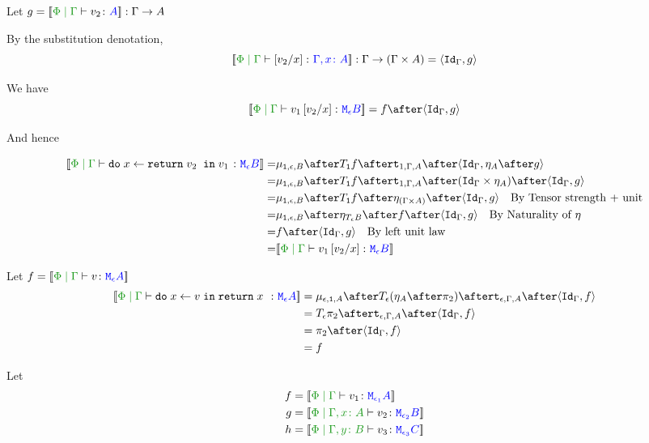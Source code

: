 \documentclass{report}
\begin{document}
Let $g = \deno{\gpetyperelation{v_2}{A}}: \G \rightarrow A$

By the substitution denotation, $$\deno{\etyperelation{\P}{\G}{\ssub{x}{v_2}}{\gax}}: \G \rightarrow (\G \times A) = \pr{\idg}{g}$$

We have $$\deno{\gpetyperelation{v_1\ssub{x}{v_2}}{\meb}} = f \after \pr{\idg}{g}$$

And hence

\begin{equation}
    \begin{split}
        \deno{\gpetyperelation{\doin{x}{\return{v_2}}{v_1}}{\meb}} = &  \bind{\1}{\e}{B} \after \T{\1}{f} \after \tstrength{1}{\G}{A} \after \pr{\idg}{\point{A}\after g} \\
        = & \bind{\1}{\e}{B} \after \T{\1}{f} \after \tstrength{1}{\G}{A} \after (\idg\times \point{A}) \after \pr{\idg}{g} \\
        = & \bind{\1}{\e}{B} \after \T{\1}{f} \after \point{(\G \times A)} \after \pr{\idg}{g} \qt{By Tensor strength + unit}\\
        = & \bind{\1}{\e}{B}\after\point{\teb}\after f\after\pr{\idg}{g} \qt{By Naturality of $\point{}$}\\
        = & f\after\pr{\idg}{g} \qt{By left unit law}\\
        = & \deno{\gpetyperelation{v_1\ssub{x}{v_2}}{\meb}}\\
    \end{split}
\end{equation}





Let $f = \deno{\gpetyperelation{v}{\mea}}$ 
    \begin{equation}
    \begin{split}
        \deno{\gpetyperelation{\doin{x}{v}{\return{x}}}{\mea}}  & = \bind{\e}{\1}{A} \after \T{\e}{(\point{A} \after \pp)} \after \tstrength{\e}{\G}{A}\after \pr{\idg}{f} \\
        & = \T{\e}{\pp} \after \tstrength{\e}{\G}{A} \after \pr {\idg}{f} \\
        & = \pp \after \pr{\idg}{f}\\
        & = f
    \end{split}
\end{equation}



Let
\begin{align*}
    f ={}& \deno{\gpetyperelation{v_1}{\M{\e_1}{A}}}\\
    g ={}& \deno{\etyperelation{\P}{\gax}{v_2}{\M{\e_2}{B}}}\\
    h ={}& \deno{\etyperelation{\P}{\gby}{v_3}{\M{\e_3}{C}}}\\
\end{align*}
\end{document}
